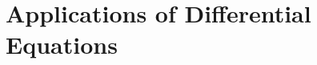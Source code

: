 \documentclass[../main.tex]{subfiles}
\begin{document}
 \section{Applications of Differential Equations}
\end{document}

